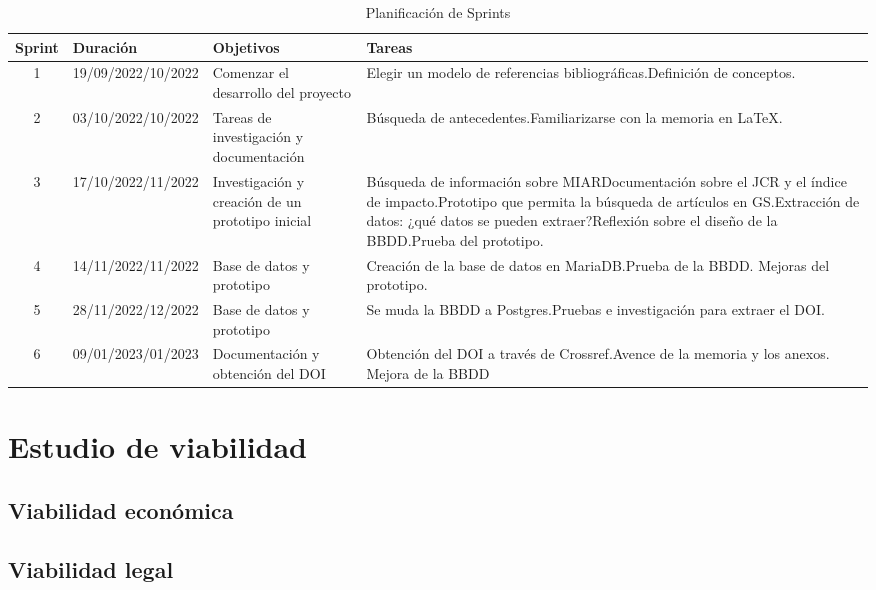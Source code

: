 \begin{table}[ht!]
  \caption{Planificación de Sprints}
  \centering
  \begin{tabular}{|c|m{2.2cm}|p{3cm}|p{5cm}|}
    \hline
    \textbf{Sprint} & \textbf{Duración} & \textbf{Objetivos} & \textbf{Tareas} \\
    \hline
    1 & 19/09/2022\newline 03/10/2022 & Comenzar el desarrollo del proyecto & Elegir un modelo de referencias bibliográficas.\newline Definición de conceptos. \\
    \hline
    2 & 03/10/2022\newline17/10/2022 & Tareas de investigación y documentación & Búsqueda de antecedentes.\newline Familiarizarse con la memoria en LaTeX. \\
    \hline
    3 & 17/10/2022\newline14/11/2022 & Investigación y creación de un prototipo inicial & Búsqueda de información sobre MIAR\newline Documentación sobre el JCR y el índice de impacto.\newline Prototipo que permita la búsqueda de artículos en GS.\newline Extracción de datos: ¿qué datos se pueden extraer?\newline Reflexión sobre el diseño de la BBDD.\newline Prueba del prototipo.\\
    \hline
    4 & 14/11/2022\newline28/11/2022 & Base de datos y prototipo & Creación de la base de datos en MariaDB.\newline Prueba de la BBDD. \newline Mejoras del prototipo. \\
    \hline
    5 & 28/11/2022\newline12/12/2022 & Base de datos y prototipo & Se muda la BBDD a Postgres.\newline Pruebas e investigación para extraer el DOI. \\
    \hline
    6 & 09/01/2023\newline23/01/2023 & Documentación y obtención del DOI & Obtención del DOI a través de Crossref.\newline Avence de la memoria y los anexos. \newline Mejora de la BBDD \\
    \hline
  \end{tabular}
\end{table}
 

\section{Estudio de viabilidad}

\subsection{Viabilidad económica}

\subsection{Viabilidad legal}


